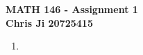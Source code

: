 \documentclass[10pt,english]{article}
\begin{document}
\noindent \begin{center}
\textbf{\large{}MATH 146 - Assignment 1}\\
\textbf{\large{}Chris Ji 20725415}
\par\end{center}{\large \par}
\medskip{}

\begin{enumerate}
\item 
\end{enumerate}
\end{document}
